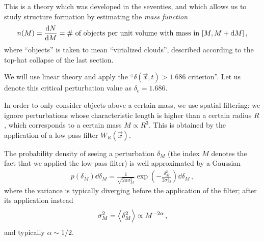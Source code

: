 \documentclass[main.tex]{subfiles}
\begin{document}
This is a theory which was developed in the seventies, and which allows us to study structure formation by estimating the \emph{mass function}
%
\begin{align}
n(M) = \dv{N}{M} = \text{\# of objects per unit volume with mass in } [M, M + \dd{M}]
\,,
\end{align}
%
where ``objects'' is taken to mean ``virialized clouds'', described according to the top-hat collapse of the last section. 

We will use linear theory and apply the ``\(\delta(\vec{x}, t) > \num{1.686}\) criterion''. Let us denote this critical perturbation value as \(\delta _c = \num{1.686}\).

In order to only consider objects above a certain mass, we use spatial filtering: we ignore perturbations whose characteristic length is higher than a certain radius \(R\), which corresponds to a certain mass \(M \propto R^3\). This is obtained by the application of a low-pass filter \(W_R(\vec{x})\).


The probability density of seeing a perturbation \(\delta _M\) (the index \(M\) denotes the fact that we applied the low-pass filter) is well approximated by a Gaussian
%
\begin{align}
p(\delta_{M}) \dd{ \delta_{M}} = \frac{1}{\sqrt{2 \pi \sigma_{M}^2}} \exp( - \frac{ \delta_{M}^2}{2 \sigma_{M}^2}) \dd{ \delta_{M}}
\,,
\end{align}
%
where the variance is typically diverging before the application of the filter; after its application instead
%
\begin{align}
\sigma_{M}^2    = \expval{ \delta_{M}^2 } \propto M^{-2 \alpha }
\,,
\end{align}
%
and typically \(\alpha \sim 1/2\). 

\end{document}

